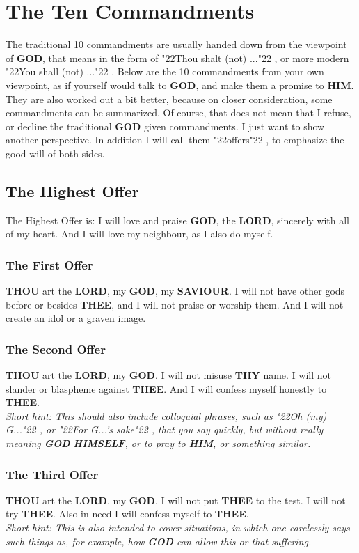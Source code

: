 \documentclass[10pt,a5paper]{article}
\newcommand{\God}[0]{\textbf{GOD}}
\newcommand{\Him}[0]{\textbf{HIM}}
\newcommand{\Himself}[0]{\textbf{HIMSELF}}
\newcommand{\Lord}[0]{\textbf{LORD}}
\newcommand{\Saviour}[0]{\textbf{SAVIOUR}}
\newcommand{\Thee}[0]{\textbf{THEE}}
\newcommand{\Thou}[0]{\textbf{THOU}}
\newcommand{\Thy}[0]{\textbf{THY}}
\newcommand{\q}[1]{\char"22{#1}\char"22 }
\begin{document}
	\section{The Ten Commandments}
		The traditional 10 commandments are usually handed down from the viewpoint of {\God},
		that means in the form of \q{Thou shalt (not) ...},
		or more modern \q{You shall (not) ...}.
		Below are the 10 commandments from your own viewpoint,
		as if yourself would talk to {\God},
		and make them a promise to {\Him}.
		They are also worked out a bit better,
		because on closer consideration,
		some commandments can be summarized.
		Of course,
		that does not mean that I refuse,
		or decline the traditional {\God} given commandments.
		I just want to show another perspective.
		In addition I will call them \q{offers},
		to emphasize the good will of both sides.
	
	\subsection{The Highest Offer}
		The Highest Offer is:
		I will love and praise {\God},
		the {\Lord},
		sincerely with all of my heart.
		And I will love my neighbour,
		as I also do myself.
		
	\subsubsection{The First Offer}
		{\Thou} art the {\Lord},
		my {\God},
		my {\Saviour}.
		I will not have other gods before or besides {\Thee},
		and I will not praise or worship them.
		And I will not create an idol or a graven image.
		
	\subsubsection{The Second Offer}
		{\Thou} art the {\Lord},
		my {\God}.
		I will not misuse {\Thy} name.
		I will not slander or blaspheme against {\Thee}.
		And I will confess myself honestly to {\Thee}.
		\\
		\textit{Short hint:
		This should also include colloquial phrases,
		such as \q{Oh (my) G...},
		or \q{For G...'s sake},
		that you say quickly,
		but without really meaning {\God} {\Himself},
		or to pray to {\Him},
		or something similar.}
			
	\subsubsection{The Third Offer}
		{\Thou} art the {\Lord},
		my {\God}.
		I will not put {\Thee} to the test.
		I will not try {\Thee}.
		Also in need I will confess myself to {\Thee}.
		\\
		\textit{Short hint:
		This is also intended to cover situations,
		in which one carelessly says such things as,
		for example,
		how {\God} can allow this or that suffering.}
		
\end{document}
